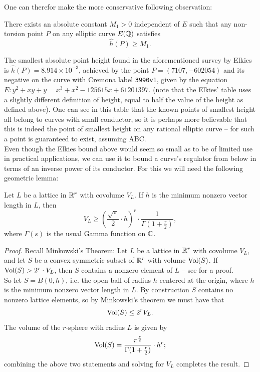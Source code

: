 One can therefor make the more conservative following observation:
\begin{corollary}[ABC]\label{conj:point_height_lower_bound}
There exists an absolute constant $M_1 >0$ independent of $E$ such that any non-torsion point $P$ on any elliptic curve $E(\mathbb{Q})$ satisfies
\begin{equation}\label{eqn:Elkies_height_lower_bound}
\hat{h}(P) \ge M_1 .
\end{equation}
\end{corollary}
The smallest absolute point height found in the aforementioned survey by Elkies is $\hat{h}(P) = 8.914\times 10^{-3}$, achieved by the point $P = (7107,-602054)$ and its negative on the curve with Cremona label {\tt 3990v1}, given by the equation $E: y^2+xy+y=x^3+x^2-125615x+61201397$. (note that the Elkies' table uses a slightly different definition of height, equal to half the value of the height as defined above). One can see in this table that the known points of smallest height all belong to curves with small conductor, so it is perhaps more believable that this is indeed the point of smallest height on any rational elliptic curve -- for such a point is guaranteed to exist, assuming ABC. \\

Even though the Elkies bound above would seem so small as to be  of limited use in practical applications, we can use it to bound a curve's regulator from below in terms of an inverse power of its conductor. For this we will need the following geometric lemma:
\begin{lemma}\label{lem:covolume_lower_bound}
Let $L$ be a lattice in $\mathbb{R}^r$ with covolume $V_L$. If $h$ is the minimum nonzero vector length in $L$, then
\begin{equation}
V _L \ge \left(\frac{\sqrt{\pi}}{2}\cdot h\right)^{r} \cdot \frac{1}{\Gamma(1+\frac{r}{2})},
\end{equation}
where $\Gamma(s)$ is the usual Gamma function on $\mathbb{C}$.
\end{lemma}
\begin{proof}
Recall Minkowski's Theorem: Let $L$ be a lattice in $\mathbb{R}^r$ with covolume $V_L$, and let $S$ be a convex symmetric subset of $\mathbb{R}^r$ with volume $\operatorname{Vol}(S)$. If $\operatorname{Vol}(S)>2^r \cdot V_L$, then $S$ contains a nonzero element of $L$ -- see \cite[p. 80]{st-2012} for a proof. \\

So let $S = B(0,h)$, i.e. the open ball of radius $h$ centered at the origin, where $h$ is the minimum nonzero vector length in $L$. By construction $S$ contains no nonzero lattice elements, so by Minkowski's theorem we must have that
\begin{equation}
\operatorname{Vol}(S) \le 2^r V_L.
\end{equation}
The volume of the $r$-sphere with radius $L$ is given by
\begin{equation}
\operatorname{Vol}(S) = \frac{\pi^{\frac{r}{2}}}{\Gamma(1+\frac{r}{2})} \cdot h^r;
\end{equation}
combining the above two statements and solving for $V_L$ completes the result.
\end{proof}

